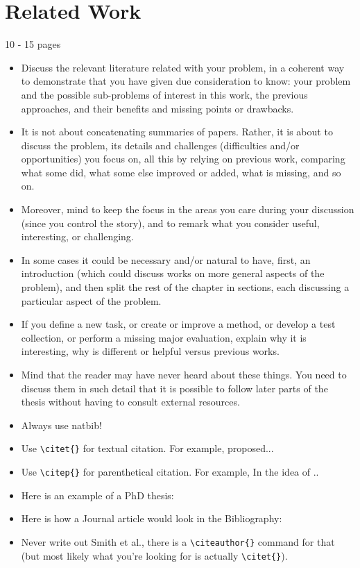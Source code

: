 
\chapter{Related Work}
\label{ch:related}
10 - 15 pages

\begin{itemize}
    \item Discuss the relevant literature related with your problem, in a coherent way to demonstrate that you have given due consideration to know: your problem and the possible sub-problems of interest in this work, the previous approaches, and their benefits and missing points or drawbacks.
    \item It is not about concatenating summaries of papers. Rather, it is about to discuss the problem, its details and challenges (difficulties and/or opportunities) you focus on, all this by relying on previous work, comparing what some did, what some else improved or added, what is missing, and so on.
    \item Moreover, mind to keep the focus in the areas you care during your discussion (since you control the story), and to remark what you consider useful, interesting, or challenging.
    \item In some cases it could be necessary and/or natural to have, first, an introduction (which could discuss works on more general aspects of the problem), and then split the rest of the chapter in sections, each discussing a particular aspect of the problem.
    \item If you define a new task, or create or improve a method, or develop a test collection, or perform a missing major evaluation, explain why it is interesting, why is different or helpful versus previous works.
    \item Mind that the reader may have never heard about these things. You need to discuss them in such detail that it is possible to follow later parts of the thesis without having to consult external resources.
    \item Always use natbib!
    \item Use \verb|\citet{}| for textual citation. For example, \citet{Balog:2018:Book} proposed...
    \item Use \verb|\citep{}| for parenthetical citation. For example, In \citep{Zhang:2020:KDD} the idea of ..
    \item Here is an example of a PhD thesis:  \citet{Maxwell:2019:PhDThesis} 
    \item Here is how a Journal article would look in the Bibliography: \citet{Sanderson:2010:FnTIR}
    \item Never write out Smith et al., there is a \verb|\citeauthor{}| command for that (but most likely what you're looking for is actually \verb|\citet{}|).
\end{itemize}

